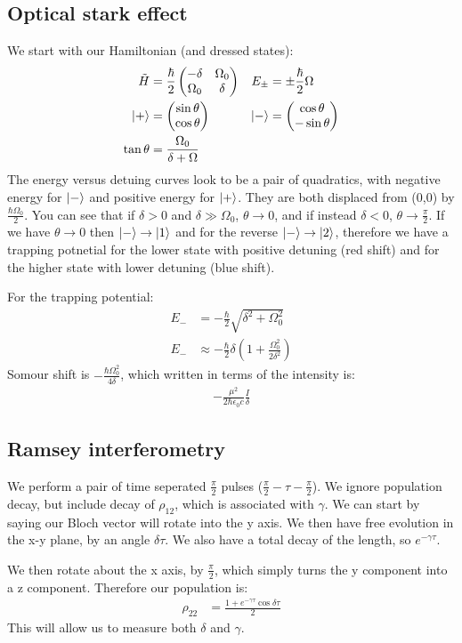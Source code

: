 \subsection*{Optical stark effect}
We start with our Hamiltonian (and dressed states):
\begin{align*}
	\tilde{H} &= \frac{\hbar}{2} \begin{pmatrix}
		-\delta & \Omega_0 \\
		\Omega_0 & \delta
				     \end{pmatrix} &
	E_\pm &= \pm \frac{\hbar}{2}\Omega \\
	\ket{+} &= \begin{pmatrix}
		\sin\theta \\
		\cos\theta
	\end{pmatrix} &
		\ket{-} &= \begin{pmatrix}
			\cos\theta \\
			-\sin\theta
			   \end{pmatrix} \\
			\tan\theta &= \frac{\Omega_0}{\delta + \Omega}
\end{align*}
The energy versus detuing curves look to be a pair of quadratics, with negative energy for $\ket{-}$ and positive energy for $\ket{+}$. They are both displaced from (0,0) by $\frac{\hbar\Omega_0}{2}$.
You can see that if $\delta>0$ and $\delta \gg \Omega_0$, $\theta\to 0$, and if instead $\delta<0$, $\theta\to\frac{\pi}{2}$. If we have $\theta\to0$ then $\ket{-}\to\ket{1}$ and for the reverse $\ket{-}\to\ket{2}$, 
therefore we have a trapping potnetial for the lower state with positive detuning (red shift) and for the higher state with lower detuning (blue shift).

For the trapping potential:
\begin{align*}
	E_- &= -\frac{\hbar}{2}\sqrt{\delta^2 +\Omega_0^2} \\
	E_- &\approx -\frac{\hbar}{2}\delta\left(1 +\frac{\Omega_0^2}{2\delta^2}\right)
\end{align*}
Somour shift is $-\frac{\hbar\Omega_0^2}{4\delta}$, which written in terms of the intensity is:
\begin{align*}
-\frac{\mu^2}{2\hbar\epsilon_0 c}\frac{I}{\delta}
\end{align*}
\subsection*{Ramsey interferometry}
We perform a pair of time seperated $\frac{\pi}{2}$ pulses ($\frac{\pi}{2} - \tau - \frac{\pi}{2}$). We ignore population decay, but include decay of $\rho_{12}$, which is associated with $\gamma$.
We can start by saying our Bloch vector will rotate into the y axis. We then have free evolution in the x-y plane, by an angle $\delta \tau$. We also have a total decay of the length, so $e^{-\gamma\tau}$.

We then rotate about the x axis, by $\frac{\pi}{2}$, which simply turns the y component into a z component. Therefore our population is:
\begin{align*}
	\rho_{22} &= \frac{1 + e^{-\gamma\tau}\cos\delta \tau}{2}
\end{align*}
This will allow us to measure both $\delta$ and $\gamma$.
